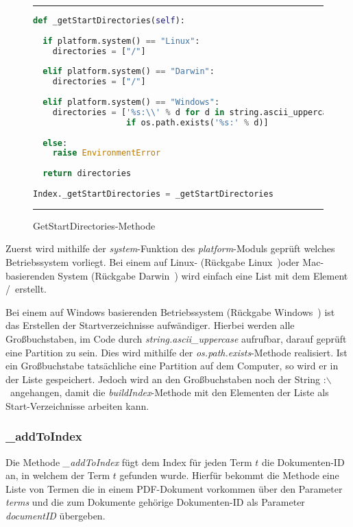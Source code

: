 \begin{figure}
	\rule{\textwidth}{0.4pt}
	\begin{lstlisting}[language=Python]
def _getStartDirectories(self):
	
  if platform.system() == "Linux":
    directories = ["/"]
	
  elif platform.system() == "Darwin":
    directories = ["/"]
	
  elif platform.system() == "Windows":
    directories = ['%s:\\' % d for d in string.ascii_uppercase
                   if os.path.exists('%s:' % d)]
	
  else:
    raise EnvironmentError
	
  return directories
	
Index._getStartDirectories = _getStartDirectories
	\end{lstlisting}
	\rule{\textwidth}{0.4pt}
	\caption{GetStartDirectories-Methode}
	\label{fig:start}
\end{figure}

Zuerst wird mithilfe der \textit{system}-Funktion des \textit{platform}-Moduls geprüft welches Betriebssystem vorliegt. Bei einem auf Linux- (Rückgabe \glqq Linux\grqq\ )oder Mac-basierenden System (Rückgabe \glqq Darwin\grqq\ ) wird einfach eine List mit dem Element \glqq /\grqq\ erstellt.

Bei einem auf Windows basierenden Betriebssystem (Rückgabe \glqq Windows\grqq\ ) ist das Erstellen der Startverzeichnisse aufwändiger. Hierbei werden alle Großbuchstaben, im Code durch \textit{string.ascii\_uppercase} aufrufbar, darauf geprüft eine Partition zu sein. Dies wird mithilfe der \textit{os.path.exists}-Methode realisiert. Ist ein Großbuchstabe tatsächliche eine Partition auf dem Computer, so wird er in der Liste gespeichert. Jedoch wird an den Großbuchstaben noch der String \glqq :$\backslash$\grqq\ angehangen, damit die \textit{buildIndex}-Methode mit den Elementen der Liste als Start-Verzeichnisse arbeiten kann.

\subsubsection{\_addToIndex}\label{addtoindex}

Die Methode \textit{\_addToIndex} fügt dem Index für jeden Term $t$ die Dokumenten-ID an, in welchem der Term $t$ gefunden wurde.  Hierfür bekommt die Methode eine Liste von Termen die in einem PDF-Dokument vorkommen über den Parameter \textit{terms} und die zum Dokumente gehörige Dokumenten-ID als Parameter \textit{documentID} übergeben.

